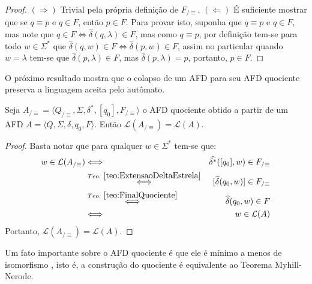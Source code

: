 \begin{proof}
	$(\Rightarrow)$ Trivial pela própria definição de $ F_{/\equiv}$. $(\Leftarrow)$ É suficiente mostrar que se $q \equiv p$ e $q \in F$, então $p \in F$. Para provar isto, suponha que $q \equiv p$ e $q \in F$, mas note que $q \in F \Longleftrightarrow \widehat{\delta}(q, \lambda) \in F$, mas como $q \equiv p$, por definição tem-se para todo $w \in \Sigma^*$ que $\widehat{\delta}(q, w) \in F \Longleftrightarrow \widehat{\delta}(p, w) \in F$, assim no particular quando $w = \lambda$ tem-se que  $\widehat{\delta}(p, \lambda) \in F$, mas $\widehat{\delta}(p, \lambda) = p$, portanto, $p \in F$.
\end{proof}


O próximo resultado mostra que o colapso de um AFD para seu AFD quociente preserva a linguagem aceita pelo autômato. 

\begin{theorem}\label{teo:LinguagemQuociente}
	Seja  $A_{/\equiv} = \langle Q_{/\equiv}, \Sigma, \delta^*, [q_0],  F_{/\equiv}\rangle$ o AFD quociente obtido a partir de um AFD $A = \langle Q, \Sigma, \delta, q_0, F\rangle$. Então $\mathcal{L}(A_{/\equiv}) = \mathcal{L}(A)$.
\end{theorem}

\begin{proof}
	Basta notar que para qualquer $w \in \Sigma^*$ tem-se que:
	\begin{eqnarray*}
		w \in \mathcal{L}(A_{/\equiv}) & \Longleftrightarrow & \widehat{\delta^*}([q_0], w) \in F_{/\equiv}\\
		& \stackrel{Teo. \ \ref{teo:ExtensaoDeltaEstrela}}{\Longleftrightarrow} & [\widehat{\delta}(q_0, w)] \in F_{/\equiv}\\
		& \stackrel{Teo. \ \ref{teo:FinalQuociente}}{\Longleftrightarrow} & \widehat{\delta}(q_0, w) \in F\\
		& \Longleftrightarrow & w \in \mathcal{L}(A)
	\end{eqnarray*}
	Portanto, $\mathcal{L}(A_{/\equiv}) = \mathcal{L}(A)$.
\end{proof}


\begin{rema}
	Um fato importante sobre o AFD quociente é que ele é mínimo a menos de isomorfismo \cite{martin2003}, isto é, a construção do quociente é equivalente ao Teorema Myhill-Nerode.
\end{rema}

